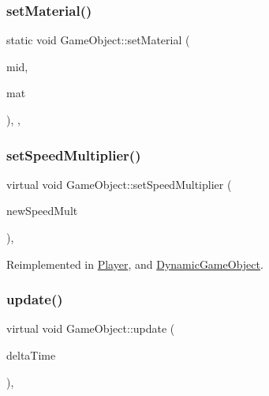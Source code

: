 \mbox{\label{class_game_object_a9cf3bf44182a7b73c714e64981e3c510}} 
\subsubsection{\texorpdfstring{set\+Material()}{setMaterial()}}
{\footnotesize\ttfamily static void Game\+Object\+::set\+Material (\begin{DoxyParamCaption}\item[{G\+Lint}]{mid,  }\item[{\hyperlink{struct_a_material}{A\+Material}}]{mat }\end{DoxyParamCaption})\hspace{0.3cm}{\ttfamily [inline]}, {\ttfamily [static]}, {\ttfamily [protected]}}

\mbox{\label{class_game_object_ab3d0617433250c19ccbb64bfca1bb905}} 
\subsubsection{\texorpdfstring{set\+Speed\+Multiplier()}{setSpeedMultiplier()}}
{\footnotesize\ttfamily virtual void Game\+Object\+::set\+Speed\+Multiplier (\begin{DoxyParamCaption}\item[{float}]{new\+Speed\+Mult }\end{DoxyParamCaption})\hspace{0.3cm}{\ttfamily [inline]}, {\ttfamily [virtual]}}



Reimplemented in \hyperlink{class_player_a9098e6b411ea9102b02bb911eca6515b}{Player}, and \hyperlink{class_dynamic_game_object_a7bf254357b0d2491044d175afdc36ca4}{Dynamic\+Game\+Object}.

\mbox{\label{class_game_object_a6dc5215a3d0efc7a9e2332006b31c868}} 
\subsubsection{\texorpdfstring{update()}{update()}}
{\footnotesize\ttfamily virtual void Game\+Object\+::update (\begin{DoxyParamCaption}\item[{int}]{delta\+Time }\end{DoxyParamCaption})\hspace{0.3cm}{\ttfamily [inline]}, {\ttfamily [virtual]}}




